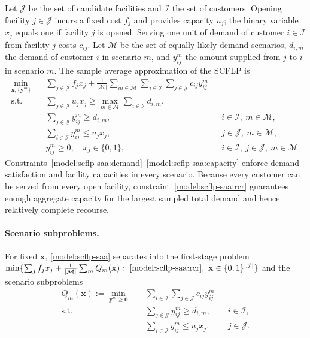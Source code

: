 Let $\mathcal J$ be the set of candidate facilities and $\mathcal I$ the set of customers. Opening facility $j\in\mathcal J$ incurs a fixed cost $f_j$ and provides capacity $u_j$; the binary variable $x_j$ equals one if facility $j$ is opened. Serving one unit of demand of customer $i\in\mathcal I$ from facility $j$ costs $c_{ij}$. Let $\mathcal M$ be the set of equally likely demand scenarios, $d_{i,m}$ the demand of customer $i$ in scenario $m$, and $y_{ij}^m$ the amount supplied from $j$ to $i$ in scenario $m$. The sample average approximation of the SCFLP is
\begin{subequations}\label{model:scflp-saa}
\begin{align}
\min_{\mathbf x,\{\mathbf y^m\}}\quad & \sum_{j\in\mathcal J}f_jx_j+\frac{1}{|\mathcal M|}\sum_{m\in\mathcal M}\sum_{i\in\mathcal I}\sum_{j\in\mathcal J}c_{ij}y_{ij}^m\\
\text{s.t.}\quad & \sum_{j\in\mathcal J}u_jx_j\ge\max_{m\in\mathcal M}\sum_{i\in\mathcal I}d_{i,m}, \label{model:scflp-saa:rcr}\\
& \sum_{j\in\mathcal J}y_{ij}^m\ge d_{i,m}, && i\in\mathcal I,\ m\in\mathcal M, \label{model:scflp-saa:demand}\\
& \sum_{i\in\mathcal I}y_{ij}^m\le u_jx_j, && j\in\mathcal J,\ m\in\mathcal M, \label{model:scflp-saa:capacity}\\
& y_{ij}^m\ge0,\quad x_j\in\{0,1\}, && i\in\mathcal I,\ j\in\mathcal J,\ m\in\mathcal M.
\end{align}
\end{subequations}
Constraints~\eqref{model:scflp-saa:demand}--\eqref{model:scflp-saa:capacity} enforce demand satisfaction and facility capacities in every scenario. Because every customer can be served from every open facility, constraint~\eqref{model:scflp-saa:rcr} guarantees enough aggregate capacity for the largest sampled total demand and hence relatively complete recourse.

\paragraph{Scenario subproblems.} For fixed $\mathbf x$, \eqref{model:scflp-saa} separates into the first-stage problem $\min\{\sum_jf_jx_j+\frac{1}{|\mathcal M|}\sum_mQ_m(\mathbf x):\ \eqref{model:scflp-saa:rcr},\ \mathbf x\in\{0,1\}^{|\mathcal J|}\}$ and the scenario subproblems
\begin{subequations}\label{model:scflp-sub}
\begin{align}
Q_m(\mathbf x):=\min_{\mathbf y^m\ge\mathbf 0}\quad & \sum_{i\in\mathcal I}\sum_{j\in\mathcal J}c_{ij}y_{ij}^m\\
\text{s.t.}\quad & \sum_{j\in\mathcal J}y_{ij}^m\ge d_{i,m}, && i\in\mathcal I,\\
& \sum_{i\in\mathcal I}y_{ij}^m\le u_jx_j, && j\in\mathcal J.
\end{align}
\end{subequations}

